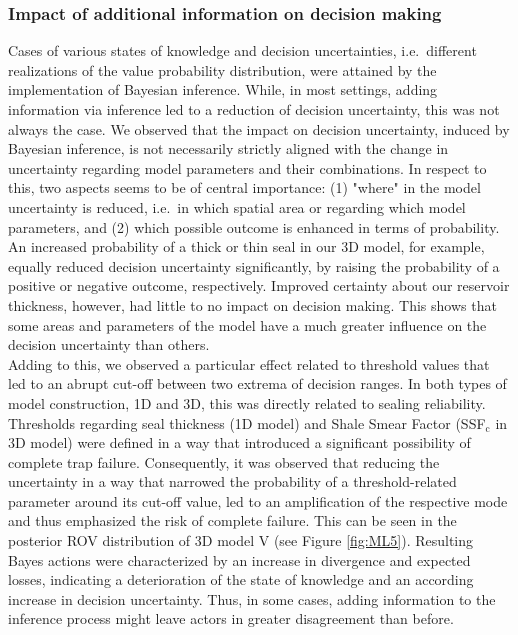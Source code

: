 	\subsubsection{Impact of additional information on decision making}
	Cases of various states of knowledge and decision uncertainties, i.e.\ different realizations of the value probability distribution, were attained by the implementation of Bayesian inference. While, in most settings, adding information via inference led to a reduction of decision uncertainty, this was not always the case. We observed that the impact on decision uncertainty, induced by Bayesian inference, is not necessarily strictly aligned with the change in uncertainty regarding model parameters and their combinations. In respect to this, two aspects seems to be of central importance: (1) "where" in the model uncertainty is reduced, i.e.\ in which spatial area or regarding which model parameters, and (2) which possible outcome is enhanced in terms of probability. An increased probability of a thick or thin seal in our 3D model, for example, equally reduced decision uncertainty significantly, by raising the probability of a positive or negative outcome, respectively. Improved certainty about our reservoir thickness, however, had little to no impact on decision making. This shows that some areas and parameters of the model have a much greater influence on the decision uncertainty than others.\\
	Adding to this, we observed a particular effect related to threshold values that led to an abrupt cut-off between two extrema of decision ranges. In both types of model construction, 1D and 3D, this was directly related to sealing reliability. Thresholds regarding seal thickness (1D model) and Shale Smear Factor (SSF$_\text{c}$ in 3D model) were defined in a way that introduced a significant possibility of complete trap failure. Consequently, it was observed that reducing the uncertainty in a way that narrowed the probability of a threshold-related parameter around its cut-off value, led to an amplification of the respective mode and thus emphasized the risk of complete failure. This can be seen in the posterior ROV distribution of 3D model V (see Figure \ref{fig:ML5}). Resulting Bayes actions were characterized by an increase in divergence and expected losses, indicating a deterioration of the state of knowledge and an according increase in decision uncertainty. Thus, in some cases, adding information to the inference process might leave actors in greater disagreement than before.\\
